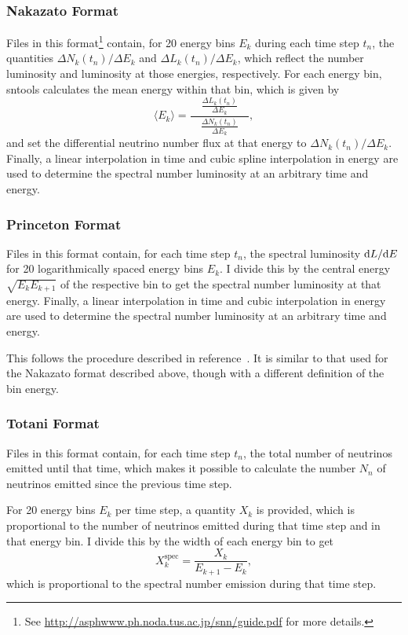 \documentclass[11pt, oneside]{article}
\renewcommand{\d}{\mathrm{d}}
\newcommand{\tdiffx}[3][\empty]{\ifx\empty#1
		\d #2 / \d #3
	\else
		\d^{#1} #2 / \d #3^{#1}
	\fi} %
\newcommand{\mean}[1]{\ensuremath{\langle #1 \rangle}}
\begin{document}
\subsubsection{Nakazato Format}
Files in this format\footnote{See \url{http://asphwww.ph.noda.tus.ac.jp/snn/guide.pdf} for more details.} contain, for 20 energy bins $E_k$ during each time step $t_n$, the quantities $\Delta N_k (t_n) / \Delta E_k$ and $\Delta L_k (t_n) / \Delta E_k$, which reflect the number luminosity and luminosity at those energies, respectively.
For each energy bin, sntools calculates the mean energy within that bin, which is given by
\begin{equation}
\mean{E_k} = \frac{\quad  \frac{\Delta L_k (t_n)}{\Delta E_k}  \quad}{  \frac{\Delta N_k (t_n)}{\Delta E_k}  },
\end{equation}
and set the differential neutrino number flux at that energy to $\Delta N_k (t_n) / \Delta E_k$.
Finally, a linear interpolation in time and cubic spline interpolation in energy are used to determine the spectral number luminosity at an arbitrary time and energy. %

\subsubsection{Princeton Format}
Files in this format contain, for each time step $t_n$, the spectral luminosity $\tdiffx{L}{E}$ for 20 logarithmically spaced energy bins $E_k$.
I divide this by the central energy $\sqrt{E_k E_{k+1}}$ of the respective bin to get the spectral number luminosity at that energy.
Finally, a linear interpolation in time and cubic interpolation in energy are used to determine the spectral number luminosity at an arbitrary time and energy.

This follows the procedure described in reference~\cite{Seadrow2018}.
It is similar to that used for the Nakazato format described above, though with a different definition of the bin energy.

\subsubsection{Totani Format}
Files in this format contain, for each time step $t_n$, the total number of neutrinos emitted until that time, which makes it possible to calculate the number $N_n$ of neutrinos emitted since the previous time step.

For 20 energy bins $E_k$ per time step, a quantity $X_k$ is provided, which is proportional to the number of neutrinos emitted during that time step and in that energy bin.
I divide this by the width of each energy bin to get
\begin{equation}
X_k^\text{spec} = \frac{X_k}{E_{k+1} - E_k},
\end{equation}
which is proportional to the spectral number emission during that time step.
\end{document}
